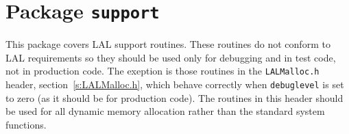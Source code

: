 \chapter{Package \texttt{support}}

This package covers LAL support routines.  These routines do not conform to
LAL requirements so they should be used only for debugging and in test code,
not in production code.  The exeption is those routines in the
\verb+LALMalloc.h+ header, section~\ref{s:LALMalloc.h}, which behave correctly
when \verb+debuglevel+ is set to zero (as it should be for production code).
The routines in this header should be used for all dynamic memory allocation
rather than the standard system functions.

\newpage
\newpage
\newpage
\newpage
